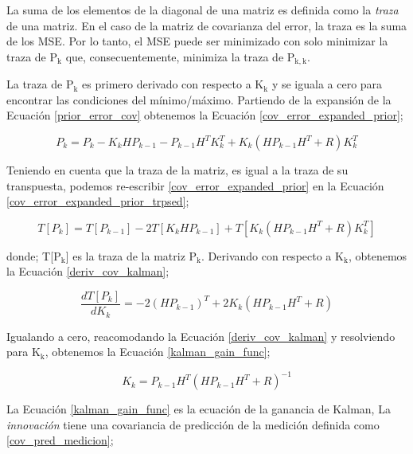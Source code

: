 \documentclass[10pt,a4paper]{article}
\begin{document}
La suma de los elementos de la diagonal de una matriz es definida como la
\emph{traza} de una matriz. En el caso de la matriz de covarianza del error,
la traza es la suma de los \acrshort{MSE}. Por lo tanto, el \acrshort{MSE} puede
ser minimizado con solo minimizar la traza de $\mathrm{P_k}$ que,
consecuentemente, minimiza la traza de $\mathrm{P_{k,k}}$.

La traza de $\mathrm{P_k}$ es primero derivado con respecto a $\mathrm{K_k}$ y
se iguala a cero para encontrar las condiciones del m\'inimo/m\'aximo. Partiendo
de la expansi\'on de la Ecuaci\'on \ref{prior_error_cov} obtenemos la Ecuaci\'on
\ref{cov_error_expanded_prior};

\begin{equation}
    P_k = P_k - K_kHP_{k-1} - P_{k-1}H^TK_k^T + K_k\left(HP_{k-1}H^T + R\right)K_k^T\label{cov_error_expanded_prior}
\end{equation}

Teniendo en cuenta que la traza de la matriz, es igual a la traza de su
transpuesta, podemos re-escribir \ref{cov_error_expanded_prior} en la Ecuaci\'on
\ref{cov_error_expanded_prior_trpsed};

\begin{equation}
    T\left[P_k\right] = T\left[P_{k-1}\right] - 2T\left[K_kHP_{k-1}\right] +
    T\left[K_k\left(HP_{k-1}H^T + R\right)K_k^T\right]
    \label{cov_error_expanded_prior_trpsed}
\end{equation}

donde; T[$\mathrm{P_k}$] es la traza de la matriz $\mathrm{P_k}$. Derivando con
respecto a $\mathrm{K_k}$, obtenemos la Ecuaci\'on \ref{deriv_cov_kalman};

\begin{equation}
    \frac{dT\left[P_k\right]}{dK_k} = -2\left(HP_{k-1}\right)^T + 2K_k\left(HP_{k-1}H^T + R\right) \label{deriv_cov_kalman}
\end{equation}

Igualando a cero, reacomodando la Ecuaci\'on \ref{deriv_cov_kalman} y
resolviendo para $\mathrm{K_k}$, obtenemos la Ecuaci\'on \ref{kalman_gain_func};

\begin{equation}
    K_k = P_{k-1}H^T\left(HP_{k-1}H^T + R\right)^{-1}\label{kalman_gain_func}
\end{equation}

La Ecuaci\'on \ref{kalman_gain_func} es la ecuaci\'on de la ganancia de Kalman,
La \emph{innovaci\'on} tiene una covariancia de predicci\'on de la medici\'on 
definida como \ref{cov_pred_medicion};
\end{document}
